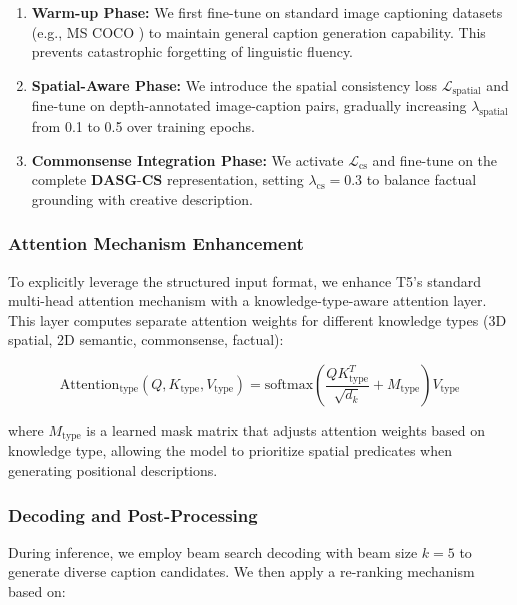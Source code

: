 \documentclass[runningheads,14pt]{llncs}
\begin{document}
\begin{enumerate}
    \item \textbf{Warm-up Phase:} We first fine-tune on standard image captioning datasets (e.g., MS COCO \cite{lin2014microsoft}) to maintain general caption generation capability. This prevents catastrophic forgetting of linguistic fluency.
    
    \item \textbf{Spatial-Aware Phase:} We introduce the spatial consistency loss $\mathcal{L}_{\text{spatial}}$ and fine-tune on depth-annotated image-caption pairs, gradually increasing $\lambda_{\text{spatial}}$ from 0.1 to 0.5 over training epochs.
    
    \item \textbf{Commonsense Integration Phase:} We activate $\mathcal{L}_{\text{cs}}$ and fine-tune on the complete $\mathbf{DASG\text{-}CS}$ representation, setting $\lambda_{\text{cs}} = 0.3$ to balance factual grounding with creative description.
\end{enumerate}

\subsubsection{Attention Mechanism Enhancement}

To explicitly leverage the structured input format, we enhance T5's standard multi-head attention mechanism with a knowledge-type-aware attention layer. This layer computes separate attention weights for different knowledge types (3D spatial, 2D semantic, commonsense, factual):

\begin{equation}
\text{Attention}_{\text{type}}(Q, K_{\text{type}}, V_{\text{type}}) = \text{softmax}\left(\frac{QK_{\text{type}}^T}{\sqrt{d_k}} + M_{\text{type}}\right)V_{\text{type}}
\end{equation}

where $M_{\text{type}}$ is a learned mask matrix that adjusts attention weights based on knowledge type, allowing the model to prioritize spatial predicates when generating positional descriptions.

\subsubsection{Decoding and Post-Processing}

During inference, we employ beam search decoding with beam size $k=5$ to generate diverse caption candidates. We then apply a re-ranking mechanism based on:
\end{document}
